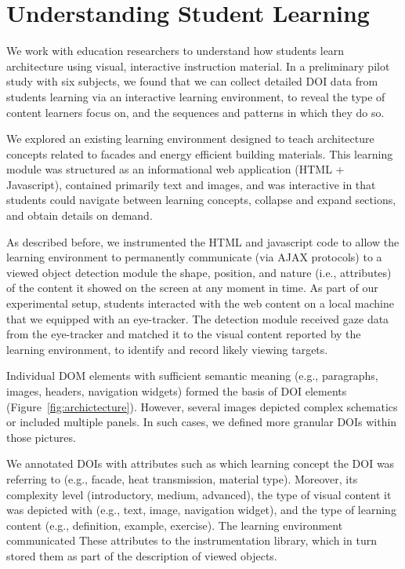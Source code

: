 \section{Understanding Student Learning}
\label{sec:ExperimentArchitecture}
We work with education researchers to understand how students learn architecture using visual, interactive instruction material. In a preliminary pilot study with six subjects, we found that we can collect detailed DOI data from students learning via an interactive learning environment, to reveal the type of content learners focus on, and the sequences and patterns in which they do so. 

We explored an existing learning environment designed to teach architecture concepts related to facades and energy efficient building materials. This learning module was structured as an informational web application (HTML + Javascript), contained primarily text and images, and was interactive in that students could navigate between learning concepts, collapse and expand sections, and obtain details on demand. 

As described before, we instrumented the HTML and javascript code to allow the learning environment to permanently communicate (via AJAX protocols) to a viewed object detection module the shape, position, and nature (i.e., attributes) of the content it showed on the screen at any moment in time. As part of our experimental setup, students interacted with the web content on a local machine that we equipped with an eye-tracker. The detection module received gaze data from the eye-tracker and matched it to the visual content reported by the learning environment, to identify and record likely viewing targets.

Individual DOM elements with sufficient semantic meaning (e.g., paragraphs, images, headers, navigation widgets) formed the basis of DOI elements (Figure~\ref{fig:archictecture}). However, several images depicted complex schematics or included multiple panels. In such cases, we defined more granular DOIs within those pictures. 

We annotated DOIs with attributes such as which learning concept the DOI was referring to (e.g., facade, heat transmission, material type). Moreover, its complexity level (introductory, medium, advanced), the type of visual content it was depicted with (e.g., text, image, navigation widget), and the type of learning content (e.g., definition, example, exercise). The learning environment communicated These attributes to the instrumentation library, which in turn stored them as part of the description of viewed objects.

